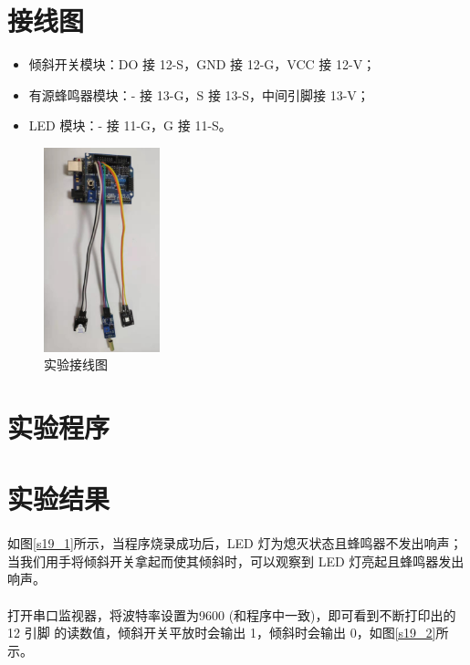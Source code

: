\documentclass[UTF8, oneside]{ctexbook}
\begin{document}
\section{接线图}
\begin{itemize}
    \item 倾斜开关模块：DO 接 12-S，GND 接 12-G，VCC 接 12-V；
    \item 有源蜂鸣器模块：- 接 13-G，S 接 13-S，中间引脚接 13-V；
    \item LED 模块：- 接 11-G，G 接 11-S。
\end{itemize}
\newpage
\begin{figure}[h]
    \centering
    \includegraphics[width=0.3\textwidth]{./result/sensor/19/lines2.png}
    \caption{实验接线图}
    \label{s19_line}
\end{figure}

\section{实验程序}


\section{实验结果}
\paragraph{}
如图\ref{s19_1}所示，当程序烧录成功后，LED 灯为熄灭状态且蜂鸣器不发出响声；
当我们用手将倾斜开关拿起而使其倾斜时，可以观察到 LED 灯亮起且蜂鸣器发出响声。

\paragraph{}
打开串口监视器，将波特率设置为9600 (和程序中一致)，即可看到不断打印出的 12 引脚
的读数值，倾斜开关平放时会输出 1，倾斜时会输出 0，如图\ref{s19_2}所示。
\end{document}
